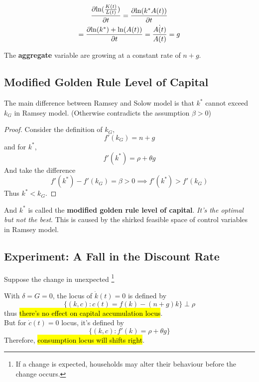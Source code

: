 \documentclass[11pt]{article}
\begin{document}
			\begin{example}
				\begin{gather}
					\frac{\partial{\ln(\frac{K(t)}{L(t)})}}{\partial{t}} = \frac{\partial{\ln(k^*A(t))}}{\partial{t}} \\
					= \frac{\partial{\ln(k^*) + \ln(A(t))}}{\partial{t}} = \frac{\dot{A(t)}}{A(t)} = g
				\end{gather}
			\end{example}
			The \textbf{aggregate} variable are growing at a constant rate of $n+g$.
			
		\subsection{Modified Golden Rule Level of Capital}
			\par The main difference between Ramsey and Solow model is that $k^*$ cannot exceed $k_G$ in Ramsey model. (Otherwise contradicts the assumption $\beta > 0$)
			\begin{proof}
				Consider the definition of $k_G$, 
				\[
					f'(k_G) = n + g
				\]
				and for $k^*$,
				\[
					f'(k^*) = \rho + \theta g
				\]
				And take the difference 
				\[
					f'(k^*) - f'(k_G) = \beta > 0 \implies f'(k^*) > f'(k_G)
				\]
				Thus $k^* < k_G$.
			\end{proof}
			And $k^*$ is called the \textbf{modified golden rule level of capital}. \emph{It's the optimal but not the best}. This is caused by the shirked feasible space of control variables in Ramsey model.
		
		\subsection{Experiment: A Fall in the Discount Rate}
			\begin{assumption}
				Suppose the change in unexpected \footnote{If a change is expected, households may alter their behaviour before the change occurs.}
			\end{assumption}
			\begin{remark}
				With $\delta = G = 0$, the locus of $\dot{k}(t) = 0$ is defined by
				\[
					\{(k, c):c(t) = f(k) - (n+g)k\} \perp \rho
				\]
				thus \hl{there's no effect on capital accumulation locus}.\\
				But for $\dot{c}(t)=0$ locus, it's defined by
				\[
					\{(k,c): f'(k) = \rho + \theta g\}
				\]
				Therefore, \hl{consumption locus will shifts right}.
			\end{remark}
\end{document}
